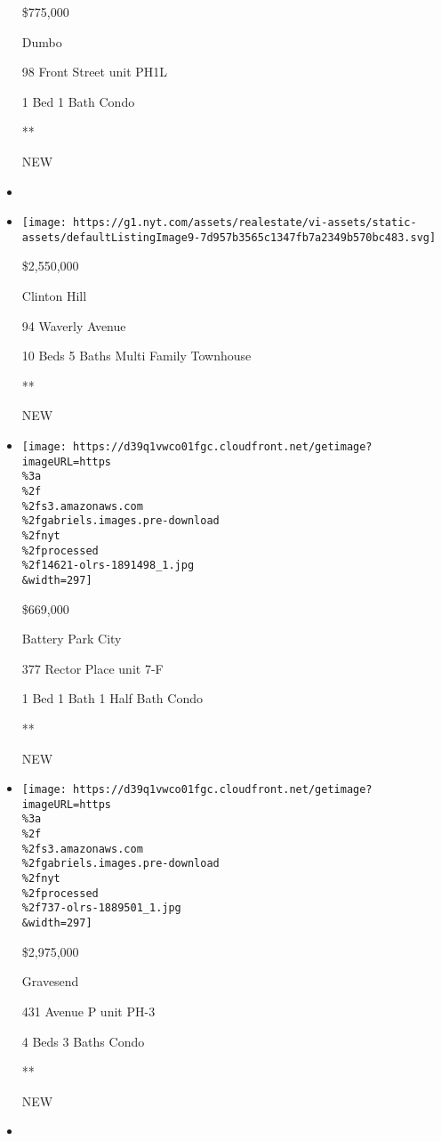 \begin{itemize}
  \$775,000

  Dumbo

  98 Front Street unit PH1L

  1 Bed \textbar{} 1 Bath \textbar{} Condo

  **

  NEW
\item
\item
  \href{/real-estate/usa/ny/brooklyn/clinton-hill/homes-for-sale/94-waverly-avenue/12436-OLRS-0079241?}{}

  \texttt{[image: https://g1.nyt.com/assets/realestate/vi-assets/static-assets/defaultListingImage9-7d957b3565c1347fb7a2349b570bc483.svg]}

  \$2,550,000

  Clinton Hill

  94 Waverly Avenue

  10 Beds \textbar{} 5 Baths \textbar{} Multi Family Townhouse

  **

  NEW
\item
  \href{/real-estate/usa/ny/new-york/battery-park-city/homes-for-sale/377-rector-place/14621-OLRS-1891498?}{}

  \texttt{[image: https://d39q1vwco01fgc.cloudfront.net/getimage?imageURL=https\\\%3a\\\%2f\\\%2fs3.amazonaws.com\\\%2fgabriels.images.pre-download\\\%2fnyt\\\%2fprocessed\\\%2f14621-olrs-1891498\_1.jpg\\\&width=297]}

  \$669,000

  Battery Park City

  377 Rector Place unit 7-F

  1 Bed \textbar{} 1 Bath \textbar{} 1 Half Bath \textbar{} Condo

  **

  NEW
\item
  \href{/real-estate/usa/ny/brooklyn/gravesend/homes-for-sale/431-avenue-p/737-OLRS-1889501?}{}

  \texttt{[image: https://d39q1vwco01fgc.cloudfront.net/getimage?imageURL=https\\\%3a\\\%2f\\\%2fs3.amazonaws.com\\\%2fgabriels.images.pre-download\\\%2fnyt\\\%2fprocessed\\\%2f737-olrs-1889501\_1.jpg\\\&width=297]}

  \$2,975,000

  Gravesend

  431 Avenue P unit PH-3

  4 Beds \textbar{} 3 Baths \textbar{} Condo

  **

  NEW
\item
  \href{/real-estate/usa/ny/staten-island/st-george/homes-for-sale/90-bay-street-landing-staten-island-ny-10301/403-1139196?}{}


\end{itemize}
